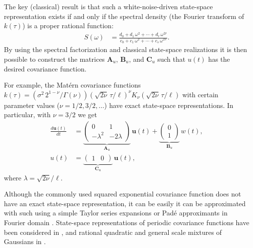 \documentclass[journal]{IEEEtran}
\begin{document}
The key (classical) result is that such a white-noise-driven state-space representation exists if and only if the spectral density (the Fourier transform of $k(\tau)$) is a proper rational function:
%
\begin{equation}
\begin{split}
  S(\omega) &= \frac{d_0 + d_1 \, \omega^2 + \cdots + d_r \, \omega^{2r}}{c_0 + c_1 \, \omega^2 + \cdots + c_s \, \omega^{2s}}.
\end{split}
\end{equation}
%
By using the spectral factorization and classical state-space realizations \cite{Sarkka+Solin+Hartikainen:2013} it is then possible to construct the matrices $\mathbf{A}_u$, $\mathbf{B}_u$, and $\mathbf{C}_u$ such that $u(t)$ has the desired covariance function. 

For example, the Mat\'ern covariance functions  $k(\tau) = \left( \sigma^2 \, 2^{1-\nu} / \Gamma(\nu)\right) \left(\sqrt{2\nu}\,\tau / \ell \right)^\nu K_\nu\left(\sqrt{2\nu}\,\tau / \ell \right)$ with certain parameter values ($\nu=1/2,3/2,\ldots$) have exact state-space representations. In particular, with $\nu=3/2$ we get
\begin{equation}
\begin{split}
\frac{d\mathbf{u}(t)}{dt} &= \underbrace{\begin{pmatrix} 0 & 1 \\ -\lambda^2 & -2\lambda \end{pmatrix}}_{\mathbf{A}_u}
 \, \mathbf{u}(t)
+ \underbrace{\begin{pmatrix} 0 \\ 1 \end{pmatrix}}_{\mathbf{B}_u} \, w(t), \\
   u(t) &= \underbrace{\begin{pmatrix} 1 & 0 \end{pmatrix}}_{\mathbf{C}_u} \, \mathbf{u}(t),
\end{split}
\end{equation}
%
where $\lambda=\sqrt{2\nu}/\ell$. 

Although the commonly used squared exponential covariance function does not have an exact state-space representation, it can be easily it can be approximated with such using a simple Taylor series expansions or Pad\'e approximants in Fourier domain \cite{Sarkka+Piche:2014}. State-space representations of periodic covariance functions have been considered in \cite{Solin+Sarkka:2014a}, and rational quadratic and general scale mixtures of Gaussians in \cite{Solin+Sarkka:2014b}.
\end{document}
